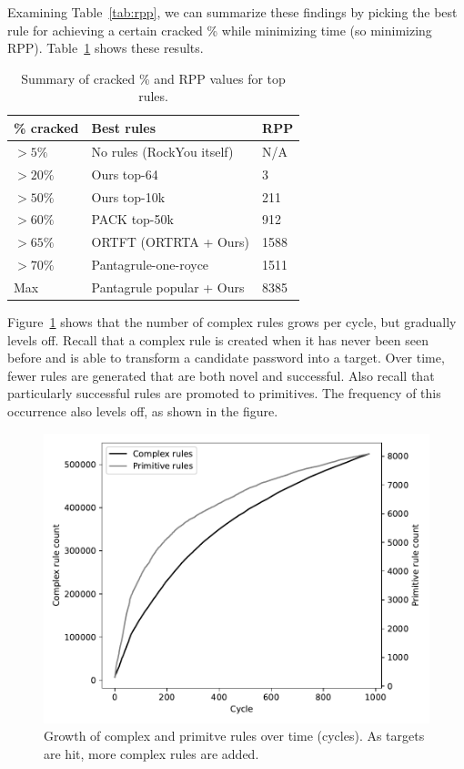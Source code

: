 \documentclass[letterpaper,twocolumn,10pt]{article}
\begin{document}
Examining Table~\ref{tab:rpp}, we can summarize these findings by picking the
best rule for achieving a certain cracked \% while minimizing time (so
minimizing RPP). Table~\ref{tab:summary} shows these results.

\begin{table}[h]
\centering
\begin{tabular}{|l|l|l|}
    \hline
    \% cracked & Best rules & RPP \\
    \hline
    $>5\%$ & No rules (RockYou itself) & N/A \\
    $>20\%$ & Ours top-64 & 3 \\
    $>50\%$ & Ours top-10k & 211 \\
    $>60\%$ & PACK top-50k & 912 \\
    $>65\%$ & ORTFT (ORTRTA + Ours) & 1588 \\
    $>70\%$ & Pantagrule-one-royce & 1511 \\
    Max & Pantagrule popular + Ours & 8385 \\
    \hline
\end{tabular}
\caption{Summary of cracked \% and RPP values for top rules.}
\label{tab:summary}
\end{table}

Figure~\ref{fig:rule-count} shows that the number of complex rules grows per
cycle, but gradually levels off. Recall that a complex rule is created when it
has never been seen before and is able to transform a candidate password into a
target. Over time, fewer rules are generated that are both novel and
successful. Also recall that particularly successful rules are promoted to
primitives. The frequency of this occurrence also levels off, as shown in the
figure.

\begin{figure}[h]
\includegraphics[width=\linewidth]
{analysis/passwords-analysis/stats-rules_composites_size.pdf}
\caption{Growth of complex and primitve rules over time (cycles). As targets
are hit, more complex rules are added. }
\label{fig:rule-count}
\end{figure}
\end{document}
